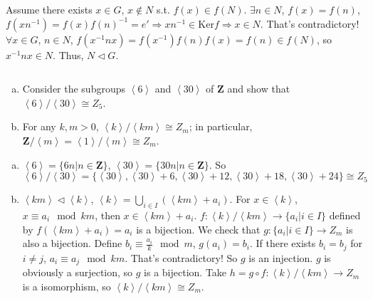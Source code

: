 \begin{answer}
    Assume there exists $x\in G$, $x\notin N$ s.t. $f(x)\in f(N)$. $\exists n\in N$, $f(x)=f(n)$, $f(xn^{-1})=f(x)f(n)^{-1}=e'\Rightarrow xn^{-1}\in\mathrm{Ker}f\Rightarrow x\in N$. That's contradictory! $\forall x\in G$, $n\in N$, $f(x^{-1}nx)=f(x^{-1})f(n)f(x)=f(n)\in f(N)$, so $x^{-1}nx\in N$. Thus, $N\lhd G$.
\end{answer}

$$ $$

\begin{ex}
    \begin{enumerate}[(a)]
        \item Consider the subgroups $\left\langle 6\right\rangle$ and $\left\langle 30\right\rangle$ of $\mathbf{Z}$ and show that $\left\langle 6\right\rangle /\left\langle 30\right\rangle\cong Z_{5}$.
        \item For any $k,m>0$, $\left\langle k\right\rangle /\left\langle km\right\rangle\cong Z_{m}$; in particular, $\mathbf{Z}/\left\langle m\right\rangle=\left\langle 1\right\rangle /\left\langle m\right\rangle\cong Z_{m}$.
    \end{enumerate}
\end{ex}

\begin{answer}
    \begin{enumerate}[(a)]
        \item $\left\langle 6\right\rangle=\{6n|n\in \mathbf{Z}\}$, $\left\langle 30\right\rangle=\{30n|n\in \mathbf{Z}\}$. So $\left\langle 6\right\rangle/\left\langle 30\right\rangle=\{\left\langle 30\right\rangle, \left\langle 30\right\rangle +6, \left\langle 30\right\rangle +12, \left\langle 30\right\rangle +18, \left\langle 30\right\rangle +24\}\cong Z_{5}$
        \item $\left\langle km\right\rangle\lhd \left\langle k\right\rangle$, $\left\langle k\right\rangle=\bigcup\limits_{i\in I}(\left\langle km\right\rangle +a_{i})$. For $x\in \left\langle k\right\rangle$, $x\equiv a_{i}\mod km$, then $x\in \left\langle km \right\rangle +a_{i}$. $f:\left\langle k\right\rangle/\left\langle km\right\rangle\to \{a_{i}|i\in I\}$ defined by $f(\left\langle km\right\rangle +a_{i})=a_{i}$ is a bijection. We check that $g: \{a_{i}|i\in I\}\to Z_{m}$ is also a bijection. Define $b_{i}\equiv \frac{a_{i}}{k}\mod m$, $g(a_{i})=b_{i}$. If there exists $b_{i}=b_{j}$ for $i\neq j$, $a_{i}\equiv a_{j}\mod km$. That's contradictory! So $g$ is an injection. $g$ is obviously a surjection, so $g$ is a bijection. Take $h= g\circ f:\left\langle k\right\rangle /\left\langle km \right\rangle\to Z_{m}$ is a isomorphism, so $\left\langle k\right\rangle /\left\langle km \right\rangle\cong Z_{m}$.
    \end{enumerate}
\end{answer}

